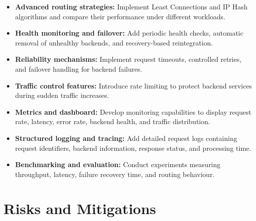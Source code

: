 \documentclass[11pt,a4paper]{article}
\begin{document}
\begin{itemize}
    \item \textbf{Advanced routing strategies:} Implement Least Connections and IP Hash algorithms and compare their performance under different workloads.

    \item \textbf{Health monitoring and failover:} Add periodic health checks, automatic removal of unhealthy backends, and recovery-based reintegration.

    \item \textbf{Reliability mechanisms:} Implement request timeouts, controlled retries, and failover handling for backend failures.

    \item \textbf{Traffic control features:} Introduce rate limiting to protect backend services during sudden traffic increases.

    \item \textbf{Metrics and dashboard:} Develop monitoring capabilities to display request rate, latency, error rate, backend health, and traffic distribution.

    \item \textbf{Structured logging and tracing:} Add detailed request logs containing request identifiers, backend information, response status, and processing time.

    \item \textbf{Benchmarking and evaluation:} Conduct experiments measuring throughput, latency, failure recovery time, and routing behaviour.
\end{itemize}

\section{Risks and Mitigations}
\end{document}
